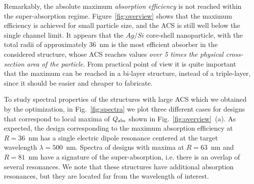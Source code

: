 \documentclass[aps,prl,twocolumn,showpacs,superscriptaddress,groupedaddress]{revtex4-1}
\begin{document}
Remarkably, the absolute maximum {\em absorption efficiency} is not reached
within the super-absorption regime. Figure~\ref{fig:overview} shows
that the maximum efficiency is achieved for small particle size, and
the ACS is still well below the single channel limit. It appears that
the $Ag/Si$ core-shell nanoparticle, with the total radii of
approximately 36~nm is the most efficient absorber in the considered
structure, whose ACS reaches values {\em over 5 times the physical
cross-section area of the particle}.  From practical point of view it
is quite important that the maximum can be reached in a bi-layer
structure, instead of a triple-layer, since it should be easier and
cheaper to fabricate.

\begin{figure}
\end{figure}
To study spectral properties of the structures with large ACS which we
obtained by the optimization, in Fig.~\ref{fig:spectra} we plot three
different cases for designs that correspond to local maxima of $Q_{\rm
  abs}$ shown in Fig.~\ref{fig:overview}~(a).  As expected, the design
corresponding to the maximum absorption efficiency at $R=36$~nm has a
single electric dipole resonance centered at the target wavelength
$\lambda=500$~nm. Spectra of designs with maxima at $R=63$~nm and
$R=81$~nm have a signature of the super-absorption, i.e. there is an
overlap of several resonances.  We note that these structures have
additional absorption resonances, but they are located far from the
wavelength of interest.
\end{document}
